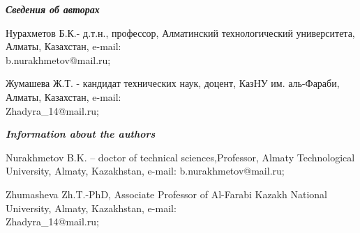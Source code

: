 \begin{authorinfo}
\emph{{\bfseries Сведения об авторах}}

Нурахметов Б.К.- д.т.н., профессор, Алматинский технологический
университета, Алматы, Казахстан, e-mail: \\b.nurakhmetov@mail.ru;

Жумашева Ж.Т. - кандидат технических наук, доцент, КазНУ им. аль-Фараби,
Алматы, Казахстан, e-mail: \\Zhadyra\_14@mail.ru;

\emph{{\bfseries Information about the authors}}

Nurakhmetov B.K. -- doctor of technical sciences,Professor, Almaty
Technological University, Almaty, Kazakhstan, e-mail: b.nurakhmetov@mail.ru;

Zhumasheva Zh.T.-PhD, Associate Professor of Al-Farabi Kazakh National
University, Almaty, Kazakhstan, e-mail:\\ Zhadyra\_14@mail.ru;
\end{authorinfo}
